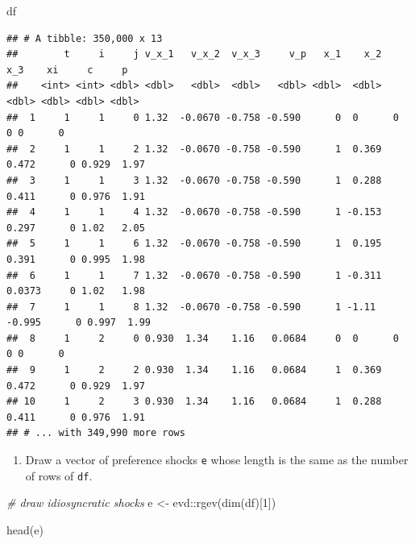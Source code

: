 \documentclass[
]{book}
\newenvironment{Shaded}{\begin{snugshade}}{\end{snugshade}}
\newcommand{\CommentTok}[1]{\textcolor[rgb]{0.56,0.35,0.01}{\textit{#1}}}
\newcommand{\DecValTok}[1]{\textcolor[rgb]{0.00,0.00,0.81}{#1}}
\newcommand{\FunctionTok}[1]{\textcolor[rgb]{0.00,0.00,0.00}{#1}}
\newcommand{\NormalTok}[1]{#1}
\newcommand{\OtherTok}[1]{\textcolor[rgb]{0.56,0.35,0.01}{#1}}
\newcommand{\SpecialCharTok}[1]{\textcolor[rgb]{0.00,0.00,0.00}{#1}}
\providecommand{\tightlist}{%
  \setlength{\itemsep}{0pt}\setlength{\parskip}{0pt}}
\begin{document}
\begin{Shaded}
\begin{Highlighting}[]
\NormalTok{df}
\end{Highlighting}
\end{Shaded}

\begin{verbatim}
## # A tibble: 350,000 x 13
##        t     i     j v_x_1   v_x_2  v_x_3     v_p   x_1    x_2     x_3    xi     c     p
##    <int> <int> <dbl> <dbl>   <dbl>  <dbl>   <dbl> <dbl>  <dbl>   <dbl> <dbl> <dbl> <dbl>
##  1     1     1     0 1.32  -0.0670 -0.758 -0.590      0  0      0          0 0      0   
##  2     1     1     2 1.32  -0.0670 -0.758 -0.590      1  0.369  0.472      0 0.929  1.97
##  3     1     1     3 1.32  -0.0670 -0.758 -0.590      1  0.288  0.411      0 0.976  1.91
##  4     1     1     4 1.32  -0.0670 -0.758 -0.590      1 -0.153  0.297      0 1.02   2.05
##  5     1     1     6 1.32  -0.0670 -0.758 -0.590      1  0.195  0.391      0 0.995  1.98
##  6     1     1     7 1.32  -0.0670 -0.758 -0.590      1 -0.311  0.0373     0 1.02   1.98
##  7     1     1     8 1.32  -0.0670 -0.758 -0.590      1 -1.11  -0.995      0 0.997  1.99
##  8     1     2     0 0.930  1.34    1.16   0.0684     0  0      0          0 0      0   
##  9     1     2     2 0.930  1.34    1.16   0.0684     1  0.369  0.472      0 0.929  1.97
## 10     1     2     3 0.930  1.34    1.16   0.0684     1  0.288  0.411      0 0.976  1.91
## # ... with 349,990 more rows
\end{verbatim}

\begin{enumerate}
\def\labelenumi{\arabic{enumi}.}
\setcounter{enumi}{5}
\tightlist
\item
  Draw a vector of preference shocks \texttt{e} whose length is the same as the number of rows of \texttt{df}.
\end{enumerate}

\begin{Shaded}
\begin{Highlighting}[]
\CommentTok{\# draw idiosyncratic shocks}
\NormalTok{e }\OtherTok{\textless{}{-}}\NormalTok{ evd}\SpecialCharTok{::}\FunctionTok{rgev}\NormalTok{(}\FunctionTok{dim}\NormalTok{(df)[}\DecValTok{1}\NormalTok{])}
\end{Highlighting}
\end{Shaded}

\begin{Shaded}
\begin{Highlighting}[]
\FunctionTok{head}\NormalTok{(e)}
\end{Highlighting}
\end{Shaded}
\end{document}
